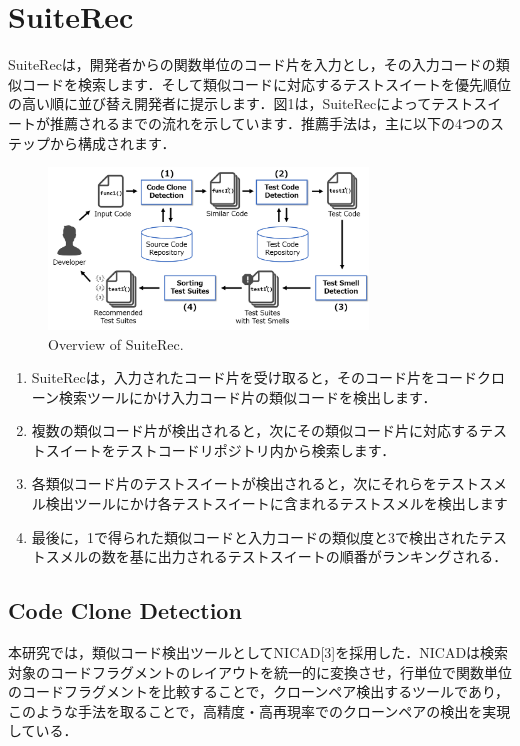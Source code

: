 \documentclass[conference]{IEEEtran}
\begin{document}
\section{SuiteRec}
SuiteRecは，開発者からの関数単位のコード片を入力とし，その入力コードの類似コードを検索します．そして類似コードに対応するテストスイートを優先順位の高い順に並び替え開発者に提示します．図1は，SuiteRecによってテストスイートが推薦されるまでの流れを示しています．推薦手法は，主に以下の4つのステップから構成されます．

\begin{figure}[htbp]
\centerline{\includegraphics[width=8.5cm]{SuiteRec-outline.pdf}}
\caption{Overview of SuiteRec.}
\label{fig1}
\end{figure}

\begin{enumerate}
\renewcommand{\labelenumi}{(\arabic{enumi})}
\item SuiteRecは，入力されたコード片を受け取ると，そのコード片をコードクローン検索ツールにかけ入力コード片の類似コードを検出します．
\item 複数の類似コード片が検出されると，次にその類似コード片に対応するテストスイートをテストコードリポジトリ内から検索します．
\item 各類似コード片のテストスイートが検出されると，次にそれらをテストスメル検出ツールにかけ各テストスイートに含まれるテストスメルを検出します
\item 最後に，1で得られた類似コードと入力コードの類似度と3で検出されたテストスメルの数を基に出力されるテストスイートの順番がランキングされる．
\end{enumerate}


\subsection{Code Clone Detection}
本研究では，類似コード検出ツールとしてNICAD[3]を採用した．NICADは検索対象のコードフラグメントのレイアウトを統一的に変換させ，行単位で関数単位のコードフラグメントを比較することで，クローンペア検出するツールであり，このような手法を取ることで，高精度・高再現率でのクローンペアの検出を実現している．
\end{document}
